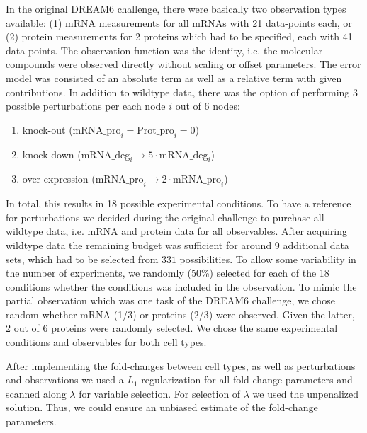 \documentclass{bioinfo}
\begin{document}
In the original DREAM6 challenge, there were basically two observation types available:
(1) mRNA measurements for all mRNAs with 21 data-points each, or (2) protein measurements for 2 proteins which had to be specified, each with 41 data-points.
The observation function was the identity, i.e. the molecular compounds were observed directly without scaling or offset parameters.
The error model was consisted of an absolute term as well as a relative term with given contributions.
In addition to wildtype data, there was the option of performing 3 possible perturbations per each node $i$ out of 6 nodes:
\begin{enumerate}
\item knock-out ($\text{mRNA\_pro}_i=\text{Prot\_pro}_i=0$)
\item knock-down ($\text{mRNA\_deg}_i\rightarrow 5\cdot \text{mRNA\_deg}_i$)
\item over-expression ($\text{mRNA\_pro}_i \rightarrow 2\cdot \text{mRNA\_pro}_i$)
\end{enumerate}
In total, this results in 18 possible experimental conditions.
To have a reference for perturbations we decided during the original challenge to purchase all wildtype data, i.e. mRNA and protein data for all observables.
After acquiring wildtype data the remaining budget was sufficient for around 9 additional data sets, which had to be selected from $331$ possibilities.
To allow some variability in the number of experiments, we randomly (50\%) selected for each of the 18 conditions whether the conditions was included in the observation.
To mimic the partial observation which was one task of the DREAM6 challenge, we chose random whether mRNA (1/3) or proteins (2/3) were observed.
Given the latter, 2 out of 6 proteins were randomly selected.
We chose the same experimental conditions and observables for both cell types.

After implementing the fold-changes between cell types, as well as perturbations and observations we used a $L_1$ regularization for all fold-change parameters and scanned along $\lambda$ for variable selection.
For selection of $\lambda$ we used the unpenalized solution.
Thus, we could ensure an unbiased estimate of the fold-change parameters.
\end{document}
